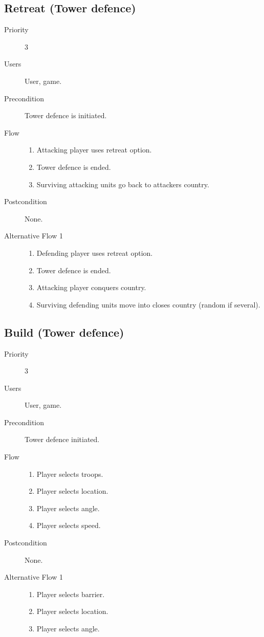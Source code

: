 \documentclass[12pt,a4paper]{article}
\begin{document}
\subsection{Retreat (Tower defence)}
\begin{description}
\item[Priority] 3
\item[Users] User, game.
\item[Precondition] Tower defence is initiated.
\item[Flow]\mbox{}
  \begin{enumerate}
  \item Attacking player uses retreat option.
  \item Tower defence is ended.
  \item Surviving attacking units go back to attackers country.
  \end{enumerate}
\item[Postcondition] None.
\item[Alternative Flow 1]\mbox{}
  \begin{enumerate}
  \item Defending player uses retreat option.
  \item Tower defence is ended.
  \item Attacking player conquers country.
  \item Surviving defending units move into closes country (random if several).
  \end{enumerate}
\end{description}

\subsection{Build (Tower defence)}
\begin{description}
\item[Priority] 3
\item[Users] User, game.
\item[Precondition] Tower defence initiated.
\item[Flow]\mbox{}
  \begin{enumerate}
  \item Player selects troops.
  \item Player selects location.
  \item Player selects angle.
  \item Player selects speed.
  \end{enumerate}
\item[Postcondition] None.
\item[Alternative Flow 1]\mbox{}
  \begin{enumerate}
  \item Player selects barrier.
  \item Player selects location.
  \item Player selects angle.
  \end{enumerate}
\end{description}
\end{document}
